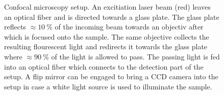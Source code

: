 		\begin{figure}[htb]
			\centering
			\caption[Confocal microscopy setup]{Confocal microscopy setup. An excitiation laser beam (red) leaves an optical fiber and is directed towards a glass plate. The glass plate reflects $\approx \SI{10}{\percent}$ of the incoming beam towards an objectiv after which is focused onto the sample. The same objective collects the resulting flourescent light and redirects it towards the glass plate where $\approx \SI{90}{\percent}$ of the light is allowed to pass. The passing \fl light is fed into an optical fiber which connects to the detection part of the setup. A flip mirror can be engaged to bring a CCD camera into the setup in case a white light source is used to illuminate the sample.}
			\label{fig::confocal_setup}
		\end{figure}

